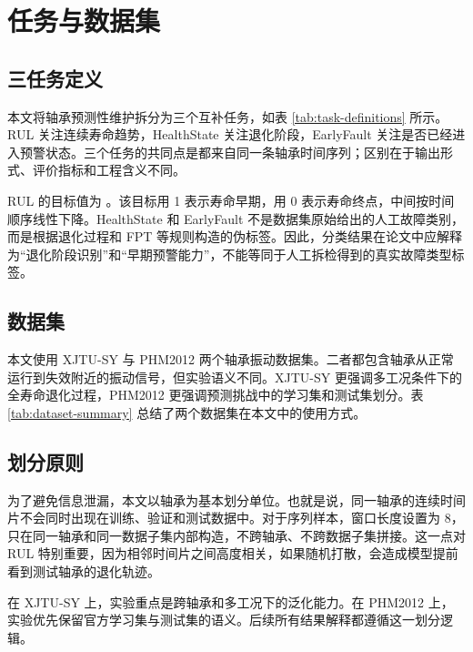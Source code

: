 \section{任务与数据集}

\subsection{三任务定义}

本文将轴承预测性维护拆分为三个互补任务，如表 \ref{tab:task-definitions} 所示。RUL 关注连续寿命趋势，HealthState 关注退化阶段，EarlyFault 关注是否已经进入预警状态。三个任务的共同点是都来自同一条轴承时间序列；区别在于输出形式、评价指标和工程含义不同。



RUL 的目标值为 。该目标用 1 表示寿命早期，用 0 表示寿命终点，中间按时间顺序线性下降。HealthState 和 EarlyFault 不是数据集原始给出的人工故障类别，而是根据退化过程和 FPT 等规则构造的伪标签。因此，分类结果在论文中应解释为“退化阶段识别”和“早期预警能力”，不能等同于人工拆检得到的真实故障类型标签。

\subsection{数据集}

本文使用 XJTU-SY 与 PHM2012 两个轴承振动数据集。二者都包含轴承从正常运行到失效附近的振动信号，但实验语义不同。XJTU-SY 更强调多工况条件下的全寿命退化过程，PHM2012 更强调预测挑战中的学习集和测试集划分。表 \ref{tab:dataset-summary} 总结了两个数据集在本文中的使用方式。



\subsection{划分原则}

为了避免信息泄漏，本文以轴承为基本划分单位。也就是说，同一轴承的连续时间片不会同时出现在训练、验证和测试数据中。对于序列样本，窗口长度设置为 8，只在同一轴承和同一数据子集内部构造，不跨轴承、不跨数据子集拼接。这一点对 RUL 特别重要，因为相邻时间片之间高度相关，如果随机打散，会造成模型提前看到测试轴承的退化轨迹。

在 XJTU-SY 上，实验重点是跨轴承和多工况下的泛化能力。在 PHM2012 上，实验优先保留官方学习集与测试集的语义。后续所有结果解释都遵循这一划分逻辑。
